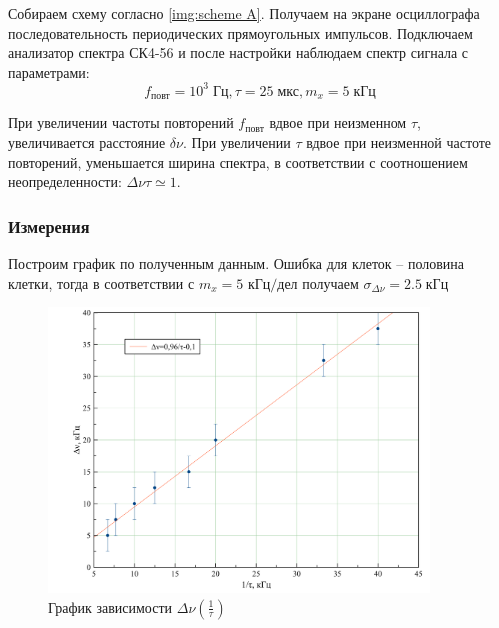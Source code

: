 \documentclass[a4paper, 12pt]{article}
\begin{document}
Собираем схему согласно \ref{img:scheme A}. Получаем на экране осциллографа последовательность периодических прямоугольных импульсов. Подключаем анализатор спектра СК4-56 и после настройки наблюдаем спектр сигнала с параметрами: $$f_\text{повт} = 10^3 \; \text{Гц}, \tau = 25 \; \text{мкс}, m_x = 5 \; \text{кГц}$$

При увеличении частоты повторений $f_\text{повт}$ вдвое при неизменном $\tau$, увеличивается расстояние $\delta \nu$. При увеличении $\tau$ вдвое при неизменной частоте повторений, уменьшается ширина спектра, в соответствии с соотношением неопределенности: $\Delta \nu \tau \simeq 1$.

\subsubsection*{Измерения}
\begin{table}[H]
\centering
{}
\caption{Зависимость ширины $\Delta \nu$ спектра  от длительности импульса $\tau$}
\end{table}
Построим график по полученным данным. Ошибка для клеток -- половина клетки, тогда в соответствии с $m_x = 5 \text{ кГц/дел}$ получаем $\sigma_{\Delta \nu} = 2.5 \; \text{кГц}$

\begin{figure}[H]
\centering
\includegraphics[width = 0.9\textwidth]{Plot_A}
\caption{График зависимости $\Delta \nu (\frac{1}{\tau})$}
\end{figure}
\end{document}
